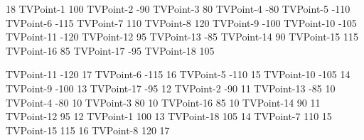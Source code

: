 
\begin{myverbbox}[\small]{\vinput}
    18
    TVPoint-1 100
    TVPoint-2 -90
    TVPoint-3 80
    TVPoint-4 -80
    TVPoint-5 -110
    TVPoint-6 -115
    TVPoint-7 110
    TVPoint-8 120
    TVPoint-9 -100
    TVPoint-10 -105
    TVPoint-11 -120
    TVPoint-12 95
    TVPoint-13 -85
    TVPoint-14 90
    TVPoint-15 115
    TVPoint-16 85
    TVPoint-17 -95
    TVPoint-18 105
\end{myverbbox}

\begin{myverbbox}[\small]{\voutput}
    TVPoint-11 -120 17
    TVPoint-6 -115 16
    TVPoint-5 -110 15
    TVPoint-10 -105 14
    TVPoint-9 -100 13
    TVPoint-17 -95 12
    TVPoint-2 -90 11
    TVPoint-13 -85 10
    TVPoint-4 -80 10
    TVPoint-3 80 10
    TVPoint-16 85 10
    TVPoint-14 90 11
    TVPoint-12 95 12
    TVPoint-1 100 13
    TVPoint-18 105 14
    TVPoint-7 110 15
    TVPoint-15 115 16
    TVPoint-8 120 17
\end{myverbbox}

